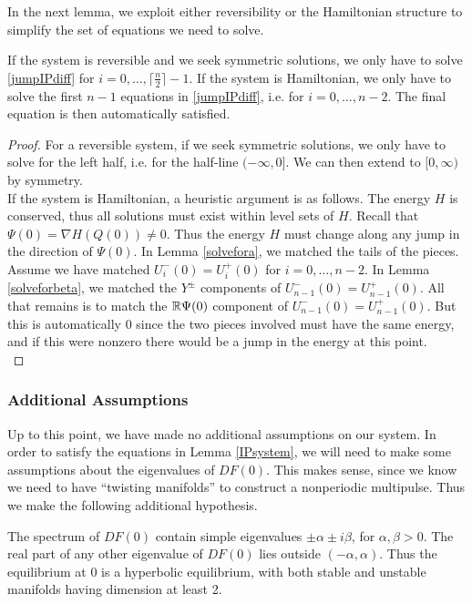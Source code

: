 \documentclass[thesis.tex]{subfiles}
\begin{document}
In the next lemma, we exploit either reversibility or the Hamiltonian structure to simplify the set of equations we need to solve.

\begin{lemma}\label{IPsystemreduced}
If the system is reversible and we seek symmetric solutions, we only have to solve \eqref{jumpIPdiff} for $i = 0, \dots, \lceil \frac{n}{2} \rceil - 1$. If the system is Hamiltonian, we only have to solve the first $n-1$ equations in \eqref{jumpIPdiff}, i.e. for $i = 0, \dots, n-2$. The final equation is then automatically satisfied.

\begin{proof}
For a reversible system, if we seek symmetric solutions, we only have to solve for the left half, i.e. for the half-line $(-\infty, 0]$. We can then extend to $[0, \infty)$ by symmetry.\\

If the system is Hamiltonian, a heuristic argument is as follows. The energy $H$ is conserved, thus all solutions must exist within level sets of $H$. Recall that $\Psi(0) = \nabla H(Q(0)) \neq 0$. Thus the energy $H$ must change along any jump in the direction of $\Psi(0)$. In Lemma \ref{solvefora}, we matched the tails of the pieces. Assume we have matched $U_i^-(0) = U_i^+(0)$ for $i = 0, \dots, n-2$. In Lemma \ref{solveforbeta}, we matched the $Y^\pm$ components of $U_{n-1}^-(0) = U_{n-1}^+(0)$. All that remains is to match the ${\mathbb R} \Psi(0)$ component of $U_{n-1}^-(0) = U_{n-1}^+(0)$. But this is automatically 0 since the two pieces involved must have the same energy, and if this were nonzero there would be a jump in the energy at this point.\\
\end{proof}
\end{lemma}

\subsubsection{Additional Assumptions}

Up to this point, we have made no additional assumptions on our system. In order to satisfy the equations in Lemma \ref{IPsystem}, we will need to make some assumptions about the eigenvalues of $DF(0)$. This makes sense, since we know we need to have ``twisting manifolds'' to construct a nonperiodic multipulse. Thus we make the following additional hypothesis.

\begin{hypothesis}\label{spechyp}
The spectrum of $DF(0)$ contain simple eigenvalues $\pm \alpha \pm i \beta$, for $\alpha, \beta > 0$. The real part of any other eigenvalue of $DF(0)$ lies outside $(-\alpha, \alpha)$. Thus the equilibrium at 0 is a hyperbolic equilibrium, with both stable and unstable manifolds having dimension at least 2.
\end{hypothesis}
\end{document}
